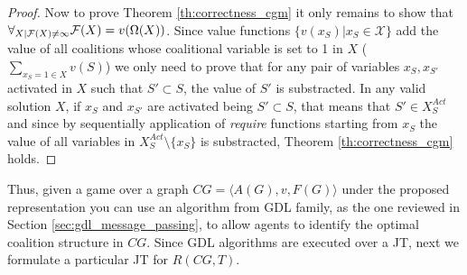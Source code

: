 \documentclass{aamas2012}
\begin{document}
\begin{proof}
Now to prove Theorem \ref{th:correctness_cgm} it only remains to show that
$\forall_{X\vert \mathcal{F}(X) \neq \infty } \break \mathcal{F}(X) =
v(\Omega(X))$. Since value functions $\{v(x_S) \vert x_S\in \mathcal{X}\}$ add the value of
all coalitions whose coalitional variable is set to 1 in $X$ ($\sum_{x_S=1
\in X} v(S)$) we only need to prove that for any pair of variables $x_S,x_{S'}$
activated in $X$ such that $S'\subset S$, the value of $S'$ is
substracted. In any valid solution $X$, if $x_S$ and $x_{S'}$ are activated
being $S'\subset S$, that means that $S'\in X^{Act}_S$ and since by sequentially
application of \emph{require} functions starting from $x_S$ the value of all 
variables in $X^{Act}_S\setminus \{x_S\}$ is substracted, Theorem
\ref{th:correctness_cgm} holds.
% 
\end{proof}



Thus, given a game over a graph $CG=\langle A(G),v,F(G)\rangle$ under the
proposed representation you can use an algorithm from GDL family, as the one reviewed in Section \ref{sec:gdl_message_passing}, to allow agents to identify the optimal coalition structure in $CG$. Since GDL algorithms
are executed over a JT, next we formulate a particular JT for $R(CG,T)$.
\end{document}
